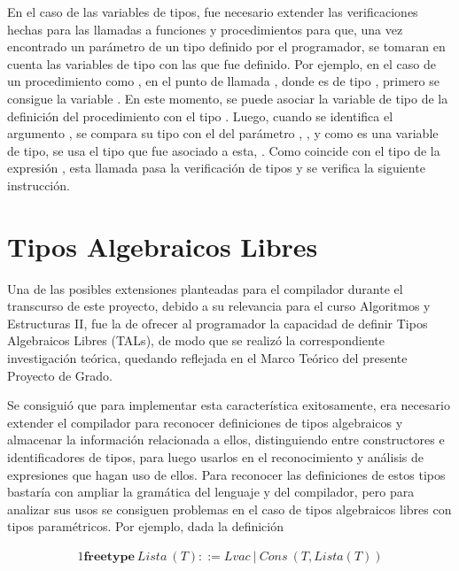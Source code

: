 {{En el caso de las variables de tipos, fue necesario extender las verificaciones
hechas para las llamadas a funciones y procedimientos para que, una vez
encontrado un parámetro de un tipo definido por el programador, se tomaran en
cuenta las variables de tipo con las que fue definido. Por ejemplo, en el caso
de un procedimiento como , en el punto
de llamada , donde  es de tipo
, primero se consigue la variable . En este
momento, se puede asociar la variable de tipo  de la definición del
procedimiento  con el tipo . Luego, cuando se
identifica el argumento , se compara su tipo con el del parámetro
, , y como es una variable de tipo, se usa el tipo que fue
asociado a esta, . Como coincide con el tipo de la expresión
, esta llamada pasa la verificación de tipos y se verifica la
siguiente instrucción.

\section{Tipos Algebraicos Libres}

Una de las posibles extensiones planteadas para el compilador durante el
transcurso de este proyecto, debido a su relevancia para el curso Algoritmos y
Estructuras II, fue la de ofrecer al programador la capacidad de definir Tipos
Algebraicos Libres (TALs), de modo que se realizó la correspondiente investigación
teórica, quedando reflejada en el Marco Teórico del presente Proyecto de Grado.

Se consiguió que para implementar esta característica exitosamente, era
necesario extender el compilador para reconocer definiciones de tipos
algebraicos y almacenar la información relacionada a ellos, distinguiendo entre
constructores e identificadores de tipos, para luego usarlos en el
reconocimiento y análisis de expresiones que hagan uso de ellos. Para reconocer
las definiciones de estos tipos bastaría con ampliar la gramática del lenguaje y
del compilador, pero para analizar sus usos se consiguen problemas en el caso de
tipos algebraicos libres con tipos paramétricos. Por ejemplo, dada la definición

\begin{alignat*}{1}
\textbf{freetype}\ Lista\ (T) ::= Lvac\ |\ Cons\ (T, Lista (T))
\end{alignat*}

}}
